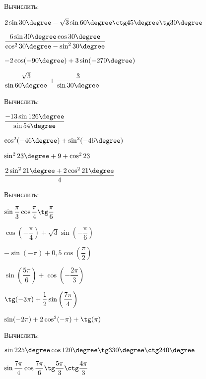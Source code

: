 \begin{class}[number=5]
	\begin{listofex}
		\item Вычислить:
		\begin{enumcols}[itemcolumns=2]
			\item \( 2\sin30\degree-\sqrt{3}\sin60\degree\ctg45\degree\tg30\degree\)
			\item \( \dfrac{6\sin30\degree\cos30\degree}{\cos^230\degree-\sin^230\degree} \)
			\item \( -2\cos(-90\degree)+3\sin(-270\degree) \)
			\item \( \dfrac{\sqrt{3}}{\sin60\degree}+\dfrac{3}{\sin30\degree} \)
		\end{enumcols}
		\item Вычислить:
		\begin{enumcols}[itemcolumns=2]
			\item \( \dfrac{-13\sin126\degree}{\sin54\degree} \)
			\item \( \cos^2(-46\degree)+\sin^2(-46\degree) \)
			\item \( \sin^223\degree+9+\cos^223 \)
			\item \( \dfrac{2\sin^221\degree+2\cos^221\degree}{4} \)
		\end{enumcols}
		\item Вычислить:
		\begin{enumcols}[itemcolumns=2]
			\item \( \sin\dfrac{\pi}{3}\cos\dfrac{\pi}{4}\tg\dfrac{\pi}{6} \)
			\item \( \cos\left( -\dfrac{\pi}{4} \right)+\sqrt{3}\sin\left( -\dfrac{\pi}{6} \right) \)
			\item \( -\sin(-\pi)+0,5\cos\left( \dfrac{\pi}{2} \right) \)
			\item \( \sin\left( \dfrac{5\pi}{6} \right)+\cos\left( -\dfrac{2\pi}{3} \right) \)
			\item \( \tg(-3\pi)+\dfrac{1}{2}\sin\left( \dfrac{7\pi}{4} \right) \)
			\item \( \sin(-2\pi)+2\cos^2(-\pi)+\tg(\pi) \)
		\end{enumcols}
		\item Вычислить:
		\begin{enumcols}[itemcolumns=2]
			\item \( \sin225\degree\cos120\degree\tg330\degree\ctg240\degree \)
			\item \( \sin\dfrac{7\pi}{4}\cos\dfrac{7\pi}{6}\tg\dfrac{5\pi}{3}\ctg\dfrac{4\pi}{3} \)

\end{enumcols}
\end{listofex}
\end{class}
